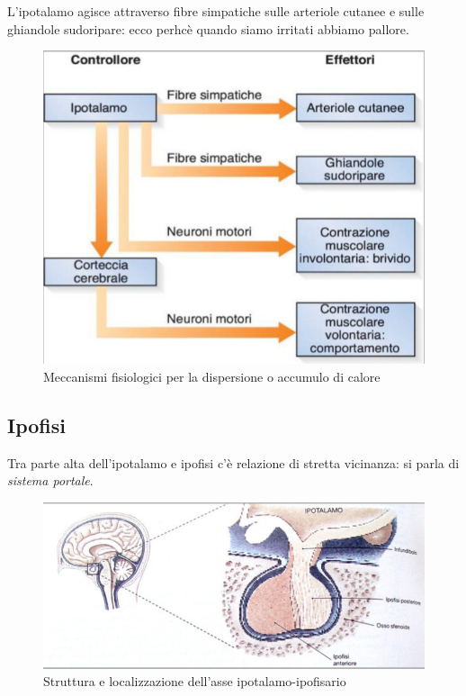\documentclass[a4paper,12pt]{article}
\begin{document}
L'ipotalamo agisce attraverso fibre simpatiche sulle arteriole cutanee e sulle ghiandole sudoripare: ecco perhcè quando siamo irritati abbiamo pallore.
\begin{figure}[H]
\centering
\includegraphics[scale=0.5]{immagine/calore.jpg}
\caption{Meccanismi fisiologici per la dispersione o accumulo di calore}
\end{figure}

\subsection{Ipofisi}
Tra parte alta dell'ipotalamo e ipofisi c'è relazione di stretta vicinanza: si parla di \emph{sistema portale}.

\begin{figure}[H]
\centering
\includegraphics[scale=0.4]{immagine/ipotalamo-ipofisario.jpg}
\caption{Struttura e localizzazione dell'asse ipotalamo-ipofisario}
\end{figure}
\end{document}
